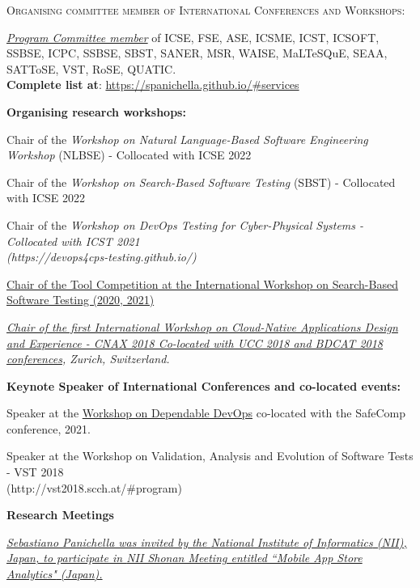 \documentclass[11pt]{article}
\begin{document}
\medskip\medskip 
\textsc{Organising committee member of International Conferences and Workshops:}
\medskip 
\begin{innerlist}
 \item \href{https://spanichella.github.io/#services}{\textit{Program Committee member}} of ICSE, FSE, ASE, ICSME, ICST, ICSOFT, SSBSE, ICPC, SSBSE, SBST, SANER, MSR, WAISE, MaLTeSQuE, SEAA, SATToSE, VST, RoSE, QUATIC.  \\\textbf{Complete list at}: \href{https://spanichella.github.io/\#services}{https://spanichella.github.io/\#services}
 \end{innerlist}
\medskip 
\textbf{Organising research workshops:}
\begin{innerlist}
\item Chair of the \textit{Workshop on Natural Language-Based Software Engineering Workshop} (NLBSE) - Collocated with ICSE 2022
\item Chair of  the \textit{Workshop on Search-Based Software Testing} (SBST) - Collocated with ICSE 2022
\item Chair of the \textit{Workshop on DevOps Testing for Cyber-Physical Systems - Collocated with ICST 2021 \\(https://devops4cps-testing.github.io/)} 
\item \href{}
{Chair of the Tool Competition at the 
International Workshop on Search-Based Software Testing (2020, 2021)} 
       \item \emph{\href{http://cnax.servicelaboratory.ch/}
                   {\textit{Chair of the first International Workshop on Cloud-Native Applications Design and Experience - CNAX 2018
Co-located with UCC 2018 and BDCAT 2018 conferences}}, Zurich, Switzerland.}
\end{innerlist}
\medskip 
\textbf{Keynote Speaker of International Conferences and co-located events:}
\begin{innerlist}
\item Speaker at the \href{https://safecomp2021.hosted.york.ac.uk/wp-content/uploads/2021/08/DepDevOps_2021_programme.pdf}{Workshop on Dependable DevOps} co-located with the SafeComp conference, 2021.
\item Speaker at the Workshop on Validation, Analysis and Evolution of Software Tests - VST 2018  \\(http://vst2018.scch.at/\#program) 
\end{innerlist}
\medskip 
\textbf{Research Meetings}
\begin{innerlist}
   \item \emph{
              \href{http://www.nii.ac.jp/��}
                   {Sebastiano Panichella was invited by the \href{http://www.nii.ac.jp/}{National Institute of Informatics} (NII), Japan, to participate in \href{http://shonan.nii.ac.jp/shonan/}{NII Shonan Meeting entitled ``Mobile App Store Analytics"} (Japan).
}}


\end{innerlist}
\end{document}
